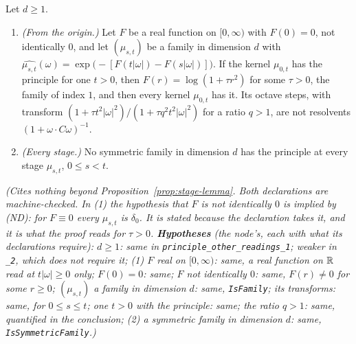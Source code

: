 \begin{proposition}
\label{prop:principle-other-readings}
\leanok
{}
Let $d \ge 1$.
\begin{enumerate}
\item \emph{(From the origin.)} Let $F$ be a real function on $[0, \infty)$ with $F(0) = 0$, not
identically $0$, and let
$(\mu_{s,t})$ be a family in dimension $d$ with
$\widehat{\mu_{s,t}}(\omega) = \exp\bigl(-[F(t|\omega|) - F(s|\omega|)]\bigr)$. If the kernel
$\mu_{0,t}$ has the principle for one $t > 0$, then $F(r) = \log(1 + \tau r^2)$ for some
$\tau > 0$, the \Matern{} family of index $1$, and then every kernel $\mu_{0,t}$ has it. Its octave
steps, with transform $(1 + \tau t^2|\omega|^2)/(1 + \tau q^2t^2|\omega|^2)$ for a ratio $q > 1$, are
not resolvents $(1 + \omega\cdot C\omega)^{-1}$.
\item \emph{(Every stage.)} No symmetric family in dimension $d$ has the principle at every stage
$\mu_{s,t}$, $0 \le s < t$.
\end{enumerate}
\statusT\quad\emph{(Cites nothing beyond Proposition~\ref{prop:stage-lemma}. Both declarations are
machine-checked. In (1) the hypothesis that $F$ is not identically $0$ is implied by (ND): for
$F \equiv 0$ every $\mu_{s,t}$ is $\delta_0$. It is stated because the declaration takes it, and it
is what the proof reads for $\tau > 0$. \textbf{Hypotheses} (the node's, each with what its
declarations require): $d \ge 1$: same in \texttt{principle\_other\_readings\_1}; weaker in
\texttt{\_2}, which does not require it; (1) $F$ real on $[0, \infty)$: same, a real function on $\mathbb{R}$
read at $t|\omega| \ge 0$ only; $F(0) = 0$: same; $F$ not identically $0$: same, $F(r) \ne 0$ for
some $r \ge 0$; $(\mu_{s,t})$ a family in dimension $d$: same, \texttt{IsFamily}; its transforms:
same, for $0 \le s \le t$; one $t > 0$ with the principle: same; the ratio $q > 1$: same, quantified
in the conclusion; (2) a symmetric family in dimension $d$: same, \texttt{IsSymmetricFamily}.)}
\end{proposition}

